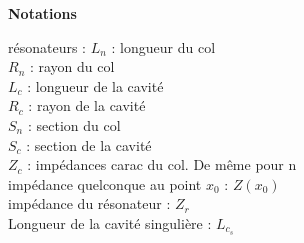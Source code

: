 \textbf{Notations}

résonateurs : 
$L_{n}$ : longueur du col\\
$R_{n}$ : rayon du col\\
$L_{c}$ : longueur de la cavité\\
$R_{c}$ : rayon de la cavité\\
$S_{n}$ : section du col\\
$S_{c}$ : section de la cavité\\
$Z_{c}$ : impédances carac du col. De même pour n\\

impédance quelconque au point $x_{0}$ : $Z(x_{0})$\\

impédance du résonateur : $Z_{r}$\\

Longueur de la cavité singulière : $L_{c_{s}}$\\ 



